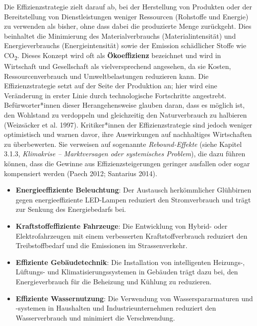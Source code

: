 \documentclass[
  nswissgerman,
  a4paper,
  DIV=11,
  numbers=noendperiod,
  oneside,
  openany]{scrreprt}
\providecommand{\tightlist}{%
  \setlength{\itemsep}{0pt}\setlength{\parskip}{0pt}}
\begin{document}
Die Effizienzstrategie zielt darauf ab, bei der Herstellung von
Produkten oder der Bereitstellung von Dienstleistungen weniger
Ressourcen (Rohstoffe und Energie) zu verwenden als bisher, ohne dass
dabei die produzierte Menge zurückgeht. Dies beinhaltet die Minimierung
des Materialverbrauchs (Materialintensität) und Energieverbrauchs
(Energieintensität) sowie der Emission schädlicher Stoffe wie
CO\textsubscript{2}. Dieses Konzept wird oft als \textbf{Ökoeffizienz}
bezeichnet und wird in Wirtschaft und Gesellschaft als vielversprechend
angesehen, da sie Kosten, Ressourcenverbrauch und Umweltbelastungen
reduzieren kann. Die Effizienzstrategie setzt auf der Seite der
Produktion an; hier wird eine Veränderung in erster Linie durch
technologische Fortschritte angestrebt. Befürworter*innen dieser
Herangehensweise glauben daran, dass es möglich ist, den Wohlstand zu
verdoppeln und gleichzeitig den Naturverbrauch zu halbieren (Weizsäcker
et al. 1997). Kritiker*innen der Effizienzstrategie sind jedoch weniger
optimistisch und warnen davor, ihre Auswirkungen auf nachhaltiges
Wirtschaften zu überbewerten. Sie verweisen auf sogenannte
\emph{Rebound-Effekte} (siehe Kapitel 3.1.3, \emph{Klimakrise --
Marktversagen oder systemisches Problem}), die dazu führen können, dass
die Gewinne aus Effizienzsteigerungen geringer ausfallen oder sogar
kompensiert werden (Paech 2012; Santarius 2014).

\begin{tcolorbox}[enhanced jigsaw, arc=.35mm, bottomrule=.15mm, bottomtitle=1mm, breakable, colback=white, colbacktitle=quarto-callout-tip-color!10!white, colframe=quarto-callout-tip-color-frame, coltitle=black, left=2mm, leftrule=.75mm, opacityback=0, opacitybacktitle=0.6, rightrule=.15mm, title={Beispiele Effizienzstrategie}, titlerule=0mm, toprule=.15mm, toptitle=1mm]

\begin{itemize}
\tightlist
\item
  \textbf{Energieeffiziente Beleuchtung}: Der Austausch herkömmlicher
  Glühbirnen gegen energieeffiziente LED-Lampen reduziert den
  Stromverbrauch und trägt zur Senkung des Energiebedarfs bei.
\item
  \textbf{Kraftstoffeffiziente Fahrzeuge}: Die Entwicklung von Hybrid-
  oder Elektrofahrzeugen mit einem verbesserten Kraftstoffverbrauch
  reduziert den Treibstoffbedarf und die Emissionen im Strassenverkehr.
\item
  \textbf{Effiziente Gebäudetechnik}: Die Installation von intelligenten
  Heizungs-, Lüftungs- und Klimatisierungssystemen in Gebäuden trägt
  dazu bei, den Energieverbrauch für die Beheizung und Kühlung zu
  reduzieren.
\item
  \textbf{Effiziente Wassernutzung}: Die Verwendung von
  Wasserspararmaturen und -systemen in Haushalten und
  Industrieunternehmen reduziert den Wasserverbrauch und minimiert die
  Verschwendung.
\end{itemize}

\end{tcolorbox}
\end{document}
